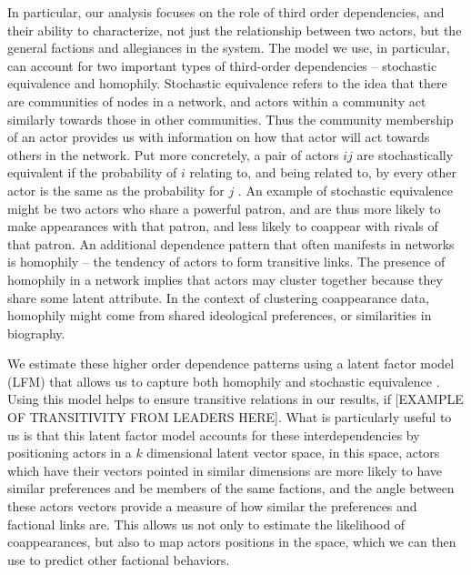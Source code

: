 \documentclass[12pt]{amsart}
\begin{document}
In particular, our analysis focuses on the role of third order dependencies, and their ability to characterize, not just the relationship between two actors, but the general factions and allegiances in the system. The model we use, in particular, can account for two important types of third-order dependencies -- stochastic equivalence and homophily. Stochastic equivalence refers to the idea that there are communities of nodes in a network, and actors within a community act similarly towards those in other communities. Thus the community membership of an actor provides us with information on how that actor will act towards others in the network. Put more concretely, a pair of actors $ij$ are stochastically equivalent if the probability of $i$ relating to, and being related to, by every other actor is the same as the probability for $j$ \citep{anderson:etal:1992}. An example of stochastic equivalence might be two actors who share a powerful patron, and are thus more likely to make appearances with that patron, and less likely to coappear with rivals of that patron. An additional dependence pattern that often manifests in networks is homophily -- the tendency of actors to form transitive links. The presence of homophily in a network implies that actors may cluster together because they share some latent attribute. In the context of clustering coappearance data, homophily might come from shared ideological preferences, or similarities in biography.

We estimate these higher order dependence patterns using a latent factor model (LFM) that allows us to capture both homophily and stochastic equivalence \citep{hoff:2007,minhas:etal:2016:arxiv}. Using this model helps to ensure transitive relations in our results, if [EXAMPLE OF TRANSITIVITY FROM LEADERS HERE]. What is particularly useful to us is that this latent factor model accounts for these interdependencies by positioning actors in a $k$ dimensional latent vector space, in this space, actors which have their vectors pointed in similar dimensions are more likely to have similar preferences and be members of the same factions, and the angle between these actors vectors provide a measure of how similar the preferences and factional links are. This allows us not only to estimate the likelihood of coappearances, but also to map actors positions in the space, which we can then use to predict other factional behaviors. 
\end{document}

